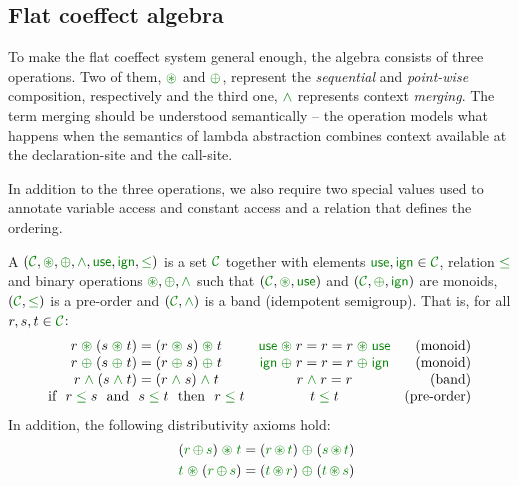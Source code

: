 
\subsection{Flat coeffect algebra}
To make the flat coeffect system general enough, the algebra consists of three operations.
Two of them, $\cseq$ and $\cpar$, represent the \emph{sequential} and \emph{point-wise} composition, 
respectively and the third one, $\czip$ represents context \emph{merging}. The term merging should be 
understood semantically -- the operation models what happens when the semantics of lambda abstraction 
combines context available at the declaration-site and the call-site.

In addition to the three operations, we also require two special values used to annotate
variable access and constant access and a relation that defines the ordering.

\begin{definition}
A \emph{} $(\C, \cseq, \cpar, \czip, \cunit, \czero, \cleq)$ is a set 
$\C$ together with elements $\cunit, \czero \in \C$, relation $\cleq$ and binary operations 
$\cseq, \cpar, \czip$ such that $(\C, \cseq, \cunit)$ and $(\C, \cpar, \czero)$ are monoids,
$(\C, \cleq)$ is a pre-order and $(\C, \czip)$ is a band (idempotent semigroup). That is, 
for all $r,s,t\in \C$:
%
\begin{equation*}
\begin{array}{ccr}
r \;\cseq\; (s \;\cseq\; t) = (r \;\cseq\; s) \;\cseq\; t  &
\cunit \;\cseq\; r = r = r \;\cseq\; \cunit &
\textnormal{(monoid)}   
\\
r \;\cpar\; (s \;\cpar\; t) = (r \;\cpar\; s) \;\cpar\; t &
\czero \;\cpar\; r = r = r \;\cpar\; \czero &
\textnormal{(monoid)}   
\\
r \;\czip\; (s \;\czip\; t) = (r \;\czip\; s) \;\czip\; t &
r\; \czip\; r = r &
\textnormal{(band)}   
\\
\textnormal{if}~~r\; \cleq\; s ~~\textnormal{and}~~s\; \cleq\; t~~\textnormal{then}~~r\; \cleq\; t&
t\; \cleq\; t &
\textnormal{(pre-order)}   
\end{array}
\end{equation*}
%
In addition, the following distributivity axioms hold:
\begin{align*}
\quad (\cclrd{r}\, \cpar\, \cclrd{s}) \;\cseq\; \cclrd{t} & = (\cclrd{r} \,\cseq\, \cclrd{t}) \;\cpar\; (\cclrd{s}\, \cseq\, \cclrd{t}) \\
\quad \cclrd{t} \;\cseq\; (\cclrd{r}\, \cpar\, \cclrd{s}) & = (\cclrd{t} \,\cseq\, \cclrd{r}) \;\cpar\; (\cclrd{t}\, \cseq\, \cclrd{s})
\end{align*}
\end{definition}


